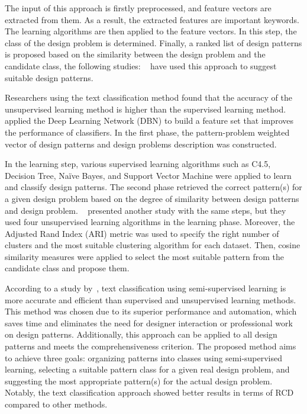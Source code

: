 The input of this approach is firstly preprocessed, and feature vectors are extracted from them. As a result, the extracted features are important keywords. The learning algorithms are then applied to the feature vectors. In this step, the class of the design problem is determined. Finally, a ranked list of design patterns is proposed based on the similarity between the design problem and the candidate class, the following studies: ~\textcite{Hasheminejad2012, Hussain2016methodology, Hussain2017software, Hussain2018framework, Hussain2018implications, Hussain2019automated, Naghdipour2023Semi} have used this approach to suggest suitable design patterns. 

Researchers using the text classification method found that the accuracy of the unsupervised learning method is higher than the supervised learning method.~\textcite{Hussain2018implications} applied the Deep Learning Network (DBN) to build a feature set that improves the performance of classifiers. In the first phase, the pattern-problem weighted vector of design patterns and design problems description was constructed.

In the learning step, various supervised learning algorithms such as C4.5, Decision Tree, Naïve Bayes, and Support Vector Machine were applied to learn and classify design patterns. The second phase retrieved the correct pattern(s) for a given design problem based on the degree of similarity between design patterns and design problem. ~\textcite{Hussain2019automated} presented another study with the same steps, but they used four unsupervised learning algorithms in the learning phase. Moreover, the Adjusted Rand Index (ARI) metric was used to specify the right number of clusters and the most suitable clustering algorithm for each dataset. Then, cosine similarity measures were applied to select the most suitable pattern from the candidate class and propose them.

According to a study by~\textcite{Naghdipour2023Semi}, text classification using semi-supervised learning is more accurate and efficient than supervised and unsupervised learning methods. This method was chosen due to its superior performance and automation, which saves time and eliminates the need for designer interaction or professional work on design patterns. Additionally, this approach can be applied to all design patterns and meets the comprehensiveness criterion. The proposed method aims to achieve three goals: organizing patterns into classes using semi-supervised learning, selecting a suitable pattern class for a given real design problem, and suggesting the most appropriate pattern(s) for the actual design problem. Notably, the text classification approach showed better results in terms of RCD compared to other methods.
    

